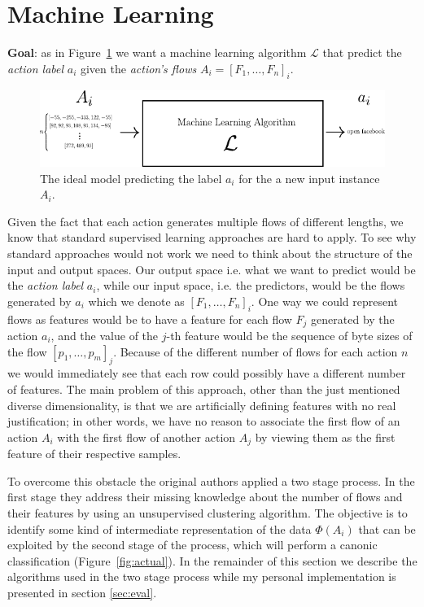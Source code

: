 \section{Machine Learning}
\label{sec:ml}

\textbf{Goal}: as in Figure~\ref{fig:ideal} we want a machine learning algorithm $\mathcal{L}$ that predict the \textit{action label} $a_i$ given the \textit{action's flows} $A_i = [F_1,\dots, F_n]_i$.

\begin{figure}[h]
 \centering
 \includegraphics{images/ideal}
 \caption{\small{The ideal model predicting the label $a_i$ for the a new input instance $A_i$.}}
 \label{fig:ideal}
\end{figure}

Given the fact that each action generates multiple flows of different lengths, we know that standard supervised learning approaches are hard to apply. To see why standard approaches would not work we need to think about the structure of the input and output spaces. Our output space i.e. what we want to predict would be the \textit{action label} $a_i$, while our input space, i.e. the predictors, would be the flows generated by $a_i$ which we denote as $[F_1,\dots,F_n]_i $. One way we could represent flows as features would be to have a feature for each flow $F_j$ generated by the action $a_i$, and the value of the $j$-th feature would be the sequence of byte sizes of the flow $[p_1,\dots, p_m]_j$. Because of the different number of flows for each action  $n$ we would immediately see that each row could possibly have a different number of features. The main problem of this approach, other than the just mentioned diverse dimensionality, is that we are artificially defining features with no real justification; in other words, we have no reason to associate the first flow of an action $A_i$ with the first flow of another action $A_j$ by viewing them as the first feature of their respective samples.


To overcome this obstacle the original authors applied a two stage process. In the first stage they address their missing knowledge about the number of flows and their features by using an unsupervised clustering algorithm. The objective is to identify some kind of intermediate representation of the data $\Phi(A_i)$ that can be exploited by the second stage of the process, which will perform a canonic classification (Figure~\ref{fig:actual}). 
In the remainder of this section we describe the algorithms used in the two stage process while my personal implementation is presented in section \ref{sec:eval}.


